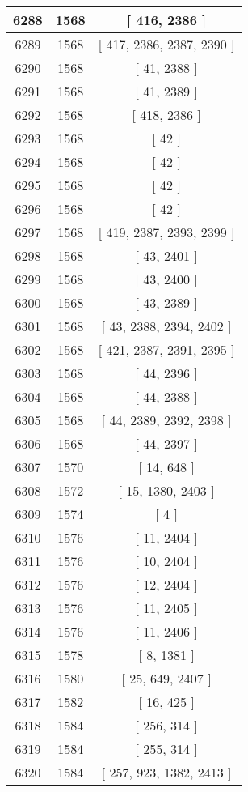 \begin{center}
\begin{longtable}[H]{|| c c c ||}
\hline
6288 & 1568 & [ 416, 2386 ] \\ 
\hline
6289 & 1568 & [ 417, 2386, 2387, 2390 ] \\ 
\hline
6290 & 1568 & [ 41, 2388 ] \\ 
\hline
6291 & 1568 & [ 41, 2389 ] \\ 
\hline
6292 & 1568 & [ 418, 2386 ] \\ 
\hline
6293 & 1568 & [ 42 ] \\ 
\hline
6294 & 1568 & [ 42 ] \\ 
\hline
6295 & 1568 & [ 42 ] \\ 
\hline
6296 & 1568 & [ 42 ] \\ 
\hline
6297 & 1568 & [ 419, 2387, 2393, 2399 ] \\ 
\hline
6298 & 1568 & [ 43, 2401 ] \\ 
\hline
6299 & 1568 & [ 43, 2400 ] \\ 
\hline
6300 & 1568 & [ 43, 2389 ] \\ 
\hline
6301 & 1568 & [ 43, 2388, 2394, 2402 ] \\ 
\hline
6302 & 1568 & [ 421, 2387, 2391, 2395 ] \\ 
\hline
6303 & 1568 & [ 44, 2396 ] \\ 
\hline
6304 & 1568 & [ 44, 2388 ] \\ 
\hline
6305 & 1568 & [ 44, 2389, 2392, 2398 ] \\ 
\hline
6306 & 1568 & [ 44, 2397 ] \\ 
\hline
6307 & 1570 & [ 14, 648 ] \\ 
\hline
6308 & 1572 & [ 15, 1380, 2403 ] \\ 
\hline
6309 & 1574 & [ 4 ] \\ 
\hline
6310 & 1576 & [ 11, 2404 ] \\ 
\hline
6311 & 1576 & [ 10, 2404 ] \\ 
\hline
6312 & 1576 & [ 12, 2404 ] \\ 
\hline
6313 & 1576 & [ 11, 2405 ] \\ 
\hline
6314 & 1576 & [ 11, 2406 ] \\ 
\hline
6315 & 1578 & [ 8, 1381 ] \\ 
\hline
6316 & 1580 & [ 25, 649, 2407 ] \\ 
\hline
6317 & 1582 & [ 16, 425 ] \\ 
\hline
6318 & 1584 & [ 256, 314 ] \\ 
\hline
6319 & 1584 & [ 255, 314 ] \\ 
\hline
6320 & 1584 & [ 257, 923, 1382, 2413 ] \\ 

\end{longtable}
\end{center}
